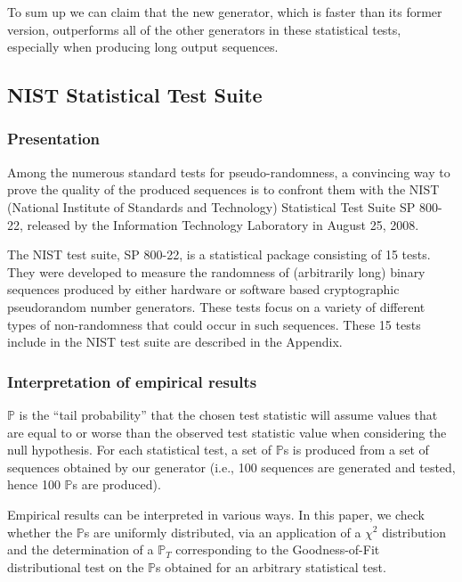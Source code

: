 \documentclass[journal]{IEEEtran}
\begin{document}
To sum up we can claim that the new generator, which is faster than its former version, outperforms all of the other generators in these statistical tests, especially when producing long output sequences.



\subsection{NIST Statistical Test Suite}

\subsubsection{Presentation}

Among the numerous standard tests for pseudo-randomness, a convincing way to prove the quality of the produced sequences is to confront them with the NIST (National Institute of Standards and Technology) Statistical Test Suite SP 800-22, released by the Information Technology Laboratory in August 25, 2008.

The NIST test suite, SP 800-22, is a statistical package consisting of 15 tests. They were developed to measure the randomness of (arbitrarily long) binary sequences produced by either hardware or software based cryptographic pseudorandom number generators. These tests focus on a variety of different types of non-randomness that could occur in such sequences. These 15 tests include in the NIST test suite are described in the Appendix.


\subsubsection{Interpretation of empirical results}

$\mathbb{P}$ is the ``tail probability'' that the chosen test statistic will assume values that are equal to or worse than the observed test statistic value when considering the null hypothesis.
For each statistical test, a set of $\mathbb{P}$s is produced from a set of sequences obtained by our generator (i.e., 100 sequences are generated and tested, hence 100 $\mathbb{P}$s are produced). 

Empirical results can be interpreted in various ways. In this paper, we check whether the $\mathbb{P}$s are uniformly distributed, via an application of
a $\chi^2$ distribution and the determination of a $\mathbb{P}_T$
corresponding to the Goodness-of-Fit distributional test
on the $\mathbb{P}$s obtained for an arbitrary statistical test. 
\end{document}
